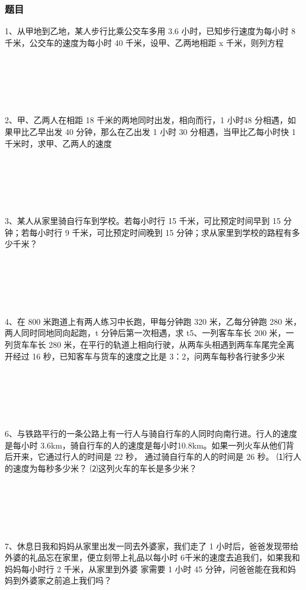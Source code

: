 \documentclass{article}
\begin{document}
\subsubsection*{题目}
1、从甲地到乙地，某人步行比乘公交车多用 3.6 小时，已知步行速度为每小时 8 千米，公交车的速度为每小时 40 千米，设甲、乙两地相距 x 千米，则列方程

~\\
~\\
~\\
~\\
~\\
2、甲、乙两人在相距 18 千米的两地同时出发，相向而行，1 小时48 分相遇，如果甲比乙早出发 40 分钟，那么在乙出发 1 小时 30 分相遇，当甲比乙每小时快 1 千米时，求甲、乙两人的速度

~\\
~\\
~\\
~\\
~\\
3、某人从家里骑自行车到学校。若每小时行 15 千米，可比预定时间早到 15 分钟；若每小时行 9 千米，可比预定时间晚到 15 分钟；求从家里到学校的路程有多少千米？

~\\
~\\
~\\
~\\
~\\
4、在 800 米跑道上有两人练习中长跑，甲每分钟跑 320 米，乙每分钟跑 280 米，两人同时同地同向起跑，t 分钟后第一次相遇，求 t5、一列客车车长 200 米，一列货车车长 280 米，在平行的轨道上相向行驶，从两车头相遇到两车车尾完全离开经过 16 秒，已知客车与货车的速度之比是 3：2，问两车每秒各行驶多少米

~\\
~\\
~\\
~\\
~\\
6、与铁路平行的一条公路上有一行人与骑自行车的人同时向南行进。行人的速度是每小时 3.6km，骑自行车的人的速度是每小时10.8km。如果一列火车从他们背后开来，它通过行人的时间是 22 秒，
通过骑自行车的人的时间是 26 秒。
⑴行人的速度为每秒多少米？
⑵这列火车的车长是多少米？

~\\
~\\
~\\
~\\
~\\
7、休息日我和妈妈从家里出发一同去外婆家，我们走了 1 小时后，爸爸发现带给外婆的礼品忘在家里，便立刻带上礼品以每小时 6千米的速度去追我们，如果我和妈妈每小时行 2 千米，从家里到外婆
家需要 1 小时 45 分钟，问爸爸能在我和妈妈到外婆家之前追上我们吗？
\end{document}
